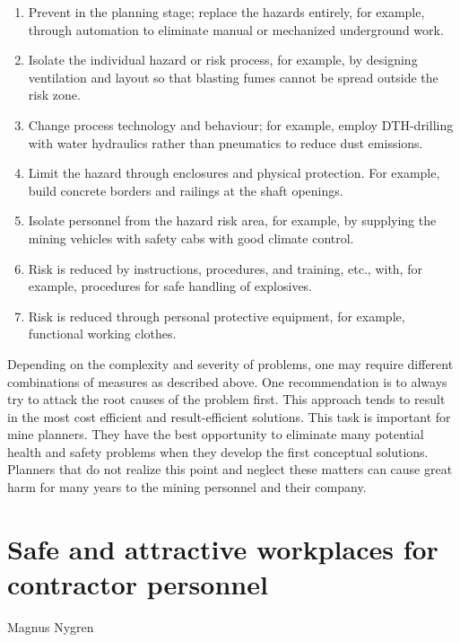 \documentclass[
  12pt,
]{scrbook}
\newenvironment{chap-auth}
{\vspace{1cm}\begin{center}\begin{flushright}\sffamily\noindent}
  {\end{flushright}\end{center}\vspace{1cm}}
\begin{document}
\begin{enumerate}
\def\labelenumi{\arabic{enumi}.}
\item
  Prevent in the planning stage; replace the hazards entirely, for example, through automation to eliminate manual or mechanized underground work.
\item
  Isolate the individual hazard or risk process, for example, by designing ventilation and layout so that blasting fumes cannot be spread outside the risk zone.
\item
  Change process technology and behaviour; for example, employ DTH-drilling with water hydraulics rather than pneumatics to reduce dust emissions.
\item
  Limit the hazard through enclosures and physical protection. For example, build concrete borders and railings at the shaft openings.
\item
  Isolate personnel from the hazard risk area, for example, by supplying the mining vehicles with safety cabs with good climate control.
\item
  Risk is reduced by instructions, procedures, and training, etc., with, for example, procedures for safe handling of explosives.
\item
  Risk is reduced through personal protective equipment, for example, functional working clothes.
\end{enumerate}

Depending on the complexity and severity of problems, one may require different combinations of measures as described above. One recommendation is to always try to attack the root causes of the problem first. This approach tends to result in the most cost efficient and result-efficient solutions. This task is important for mine planners. They have the best opportunity to eliminate many potential health and safety problems when they develop the first conceptual solutions. Planners that do not realize this point and neglect these matters can cause great harm for many years to the mining personnel and their company.

\hypertarget{safe-and-attractive-workplaces-for-contractor-personnel}{%
\chapter{Safe and attractive workplaces for contractor personnel}\label{safe-and-attractive-workplaces-for-contractor-personnel}}

\begin{chap-auth}
Magnus Nygren
\end{chap-auth}
\end{document}
